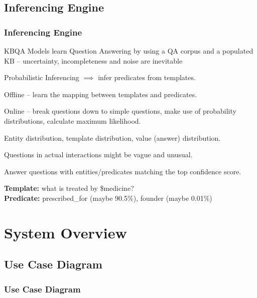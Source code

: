 \documentclass[t]{beamer}
\begin{document}
\subsection{Inferencing Engine}
\begin{frame}
    \frametitle{Inferencing Engine}
    \begin{itemize}
    \small{\item KBQA Models learn Question Answering by using a QA corpus and a populated KB -- uncertainty, incompleteness and noise are inevitable
    \item Probabilistic Inferencing $\implies$ infer predicates from templates.
    \item Offline -- learn the mapping between templates and predicates.
    \item Online -- break questions down to simple questions, make use of probability distributions, calculate maximum likelihood.
    \item Entity distribution, template distribution, value (answer) distribution.
    \item Questions in actual interactions might be vague and unusual.
    \item Answer questions with entities/predicates matching the top confidence score.}
    \end{itemize}
    \begin{example}
    \footnotesize{\textbf{Template:} what is {\color{teal} treated} by {\color{red} \$medicine}?\\
    \textbf{Predicate:} {\color{teal} prescribed\_for} (maybe 90.5\%), {\color{teal} founder} (maybe 0.01\%)}
    \end{example}
\end{frame}

\section{System Overview}
\subsection{Use Case Diagram}
\begin{frame}[c]
    \frametitle{Use Case Diagram}
    \begin{figure}
        \centering
        \def\svgwidth{\columnwidth}
        \resizebox{0.55\textwidth}{!}{}
    \end{figure}
\end{frame}
\end{document}

